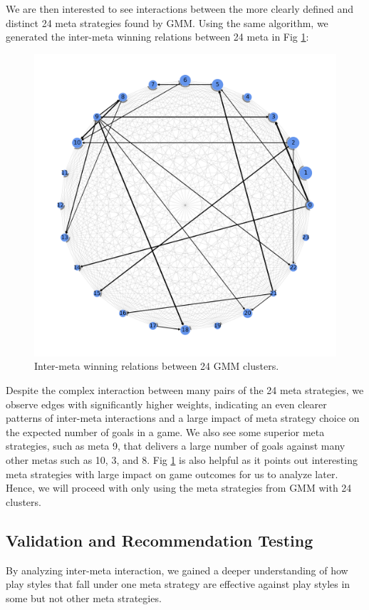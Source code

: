 \documentclass{article}
\begin{document}
We are then interested to see interactions between the more clearly defined and distinct 24 meta strategies found by GMM. Using the same algorithm, we generated the inter-meta winning relations between 24 meta in Fig \ref{fig:gmm24}:

\begin{figure}[H]
\centering
\includegraphics[width=.7\textwidth]{gmm24.png}
\caption{Inter-meta winning relations between 24 GMM clusters.}
\label{fig:gmm24}
\end{figure}

Despite the complex interaction between many pairs of the 24 meta strategies, we observe edges with significantly higher weights, indicating an even clearer patterns of inter-meta interactions and a large impact of meta strategy choice on the expected number of goals in a game. We also see some superior meta strategies, such as meta 9, that delivers a large number of goals against many other metas such as 10, 3, and 8.  Fig \ref{fig:gmm24} is also helpful as it points out interesting meta strategies with large impact on game outcomes for us to analyze later. Hence, we will proceed with only using the meta strategies from GMM with 24 clusters.



\subsection{Validation and Recommendation Testing}
By analyzing inter-meta interaction, we gained a deeper understanding of how play styles that fall under one meta strategy are effective against play styles in some but not other meta strategies.
\end{document}
